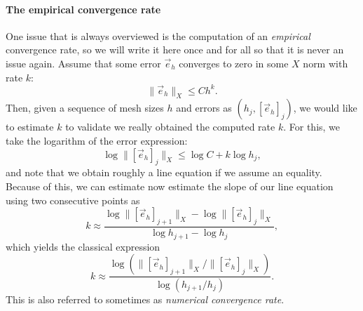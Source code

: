\paragraph{The empirical convergence rate} One issue that is always overviewed is the computation of an \emph{empirical} convergence rate, so we will write it here once and for all so that it is never an issue again. Assume that some error $\vec e_h$ converges to zero in some $X$ norm with rate $k$:
\begin{equation*}
    \|\vec e_h\|_X \leq C h^k.
\end{equation*}
Then, given a sequence of mesh sizes $h$ and errors as $(h_j, [\vec e_h]_j)$, we would like to estimate $k$ to validate we really obtained the computed rate $k$. For this, we take the logarithm of the error expression:
\begin{equation*}
    \log \|[\vec e_h]_j\|_X \leq \log C + k \log h_j,
\end{equation*}
and note that we obtain roughly a line equation if we assume an equality. Because of this, we can estimate now estimate the slope of our line equation using two consecutive points as
\begin{equation*}
    k \approx \frac{\log \|[\vec e_h]_{j+1}\|_X - \log \|[\vec e_h]_j\|_X}{ \log h_{j+1} - \log h_j},
\end{equation*}
which yields the classical expression
\begin{equation}
    k \approx  \frac{\log \left(\|[\vec e_h]_{j+1}\|_X / \|[\vec e_h]_j\|_X\right)}{ \log \left(h_{j+1} / h_j\right)}.
\end{equation}
This is also referred to sometimes as \emph{numerical convergence rate}. 

